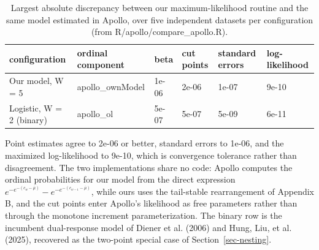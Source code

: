\documentclass[
  letterpaper,
  DIV=11,
  numbers=noendperiod]{scrartcl}
\theoremstyle{plain}
\theoremstyle{plain}
\theoremstyle{plain}
\theoremstyle{remark}
\begin{document}
\begin{longtable}[]{@{}
  >{\raggedright\arraybackslash}p{}
  >{\raggedright\arraybackslash}p{}
  >{\raggedright\arraybackslash}p{}
  >{\raggedright\arraybackslash}p{}
  >{\raggedright\arraybackslash}p{}
  >{\raggedright\arraybackslash}p{}@{}}

\caption{\label{tbl-apollo}Largest absolute discrepancy between our
maximum-likelihood routine and the same model estimated in Apollo, over
five independent datasets per configuration (from
R/apollo/compare\_apollo.R).}

\tabularnewline

\toprule\noalign{}
\begin{minipage}[b]{\linewidth}\raggedright
configuration
\end{minipage} & \begin{minipage}[b]{\linewidth}\raggedright
ordinal component
\end{minipage} & \begin{minipage}[b]{\linewidth}\raggedright
beta
\end{minipage} & \begin{minipage}[b]{\linewidth}\raggedright
cut points
\end{minipage} & \begin{minipage}[b]{\linewidth}\raggedright
standard errors
\end{minipage} & \begin{minipage}[b]{\linewidth}\raggedright
log-likelihood
\end{minipage} \\
\midrule\noalign{}
\endhead
\bottomrule\noalign{}
\endlastfoot
Our model, W = 5 & apollo\_ownModel & 1e-06 & 2e-06 & 1e-07 & 9e-10 \\
Logistic, W = 2 (binary) & apollo\_ol & 5e-07 & 5e-07 & 5e-09 & 6e-11 \\

\end{longtable}

Point estimates agree to 2e-06 or better, standard errors to 1e-06, and
the maximized log-likelihood to 9e-10, which is convergence tolerance
rather than disagreement. The two implementations share no code: Apollo
computes the ordinal probabilities for our model from the direct
expression
\(e^{-e^{-(c_w - \overline{\mu})}} - e^{-e^{-(c_{w-1} - \overline{\mu})}}\),
while ours uses the tail-stable rearrangement of Appendix B, and the cut
points enter Apollo's likelihood as free parameters rather than through
the monotone increment parameterization. The binary row is the incumbent
dual-response model of Diener et al. (2006) and Hung, Liu, et al.
(2025), recovered as the two-point special case of
Section~\ref{sec-nesting}.
\end{document}
